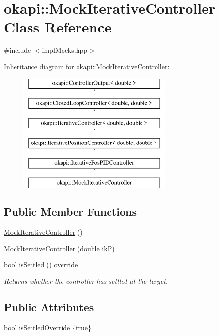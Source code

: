 \hypertarget{classokapi_1_1MockIterativeController}{}\section{okapi\+::Mock\+Iterative\+Controller Class Reference}
\label{classokapi_1_1MockIterativeController}


{\ttfamily \#include $<$impl\+Mocks.\+hpp$>$}

Inheritance diagram for okapi\+::Mock\+Iterative\+Controller\+:\begin{figure}[H]
\begin{center}
\leavevmode
\includegraphics[height=6.000000cm]{classokapi_1_1MockIterativeController}
\end{center}
\end{figure}
\subsection*{Public Member Functions}
\begin{DoxyCompactItemize}
\item 
\mbox{\hyperlink{classokapi_1_1MockIterativeController_a4ff330ae1679fc075ccb7ca9646d8c5c}{Mock\+Iterative\+Controller}} ()
\item 
\mbox{\hyperlink{classokapi_1_1MockIterativeController_a15a2bfbf9ecba82751d875169c39690f}{Mock\+Iterative\+Controller}} (double ikP)
\item 
bool \mbox{\hyperlink{classokapi_1_1MockIterativeController_a25901732ebc3b8ea82ed5c024071f4a4}{is\+Settled}} () override
\begin{DoxyCompactList}\small\item\em Returns whether the controller has settled at the target. \end{DoxyCompactList}\end{DoxyCompactItemize}
\subsection*{Public Attributes}
\begin{DoxyCompactItemize}
\item 
bool \mbox{\hyperlink{classokapi_1_1MockIterativeController_a30b65d74b272a8a1ff7747d4baf4e4dd}{is\+Settled\+Override}} \{true\}
\end{DoxyCompactItemize}
